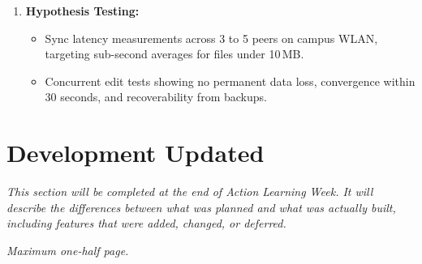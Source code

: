 \begin{enumerate}
    \item \textbf{Hypothesis Testing:}
    \begin{itemize}
        \item[$H_1$:] Sync latency measurements across 3 to 5 peers on campus WLAN, targeting sub-second averages for files under 10\,MB.
        \item[$H_2$:] Concurrent edit tests showing no permanent data loss, convergence within 30 seconds, and recoverability from backups.
    \end{itemize}
\end{enumerate}

\section{Development Updated}
\label{sec:results-updated}

\textit{This section will be completed at the end of Action Learning Week. It will describe the differences between what was planned and what was actually built, including features that were added, changed, or deferred.}

\textit{Maximum one-half page.}

